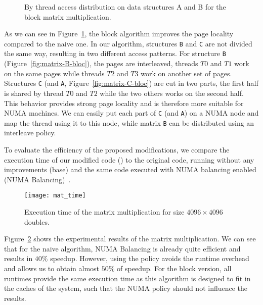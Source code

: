 \begin{figure}[htb]
    \centering
    \caption{By thread access distribution on data structures A and B for the
    block matrix multiplication.}
    \label{fig:matrix-bloc}
\end{figure}

As we can see in Figure~\ref{fig:matrix-bloc}, the block algorithm improves the page
locality compared to the naive one. In our algorithm, structures \texttt{B}
and \texttt{C} are not divided the same way, resulting in two different access patterns. For structure \texttt{B} (Figure~\ref{fig:matrix-B-bloc}), the pages
are interleaved, threads $T0$ and $T1$ work on the same pages while threads
$T2$ and $T3$ work on another set of pages. Structures \texttt{C} (and
\texttt{A}, Figure~\ref{fig:matrix-C-bloc}) are cut in two parts, the first half
is shared by thread $T0$ and $T2$ while the two others works on the second
half. This behavior provides strong page locality and is therefore more
suitable for NUMA machines. We can easily put each part of \texttt{C} (and
\texttt{A}) on a NUMA node and map the thread using it to this node, while matrix
\texttt{B} can be distributed using an interleave policy.

To evaluate the efficiency of the proposed modifications, we compare the execution
time of our modified code (\TABARNAC) to the original code, running without any
improvements (base) and the same code executed with NUMA balancing enabled
(NUMA Balancing)~\cite{Corbet}.

\begin{figure}[htb]
    \centering
    \texttt{[image: mat\_time]}
    \caption{Execution time of the matrix multiplication for size $4096\times 4096$ doubles.}
    \label{fig:matrix-res}
\end{figure}

Figure~\ref{fig:matrix-res} shows the experimental results of the matrix multiplication. We can see that for
the naive algorithm, NUMA Balancing is already quite efficient and results in $40\%$
speedup. However, using the \TABARNAC policy avoids the runtime overhead and
allows us to obtain almost $50\%$ of speedup. For the block version, all runtimes
provide the same execution time as this algorithm is designed to fit in the
caches of the system, such that the NUMA policy should not influence the results.


